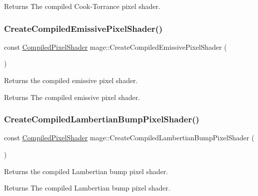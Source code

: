 \begin{DoxyReturn}{Returns}
The compiled Cook-\/\+Torrance pixel shader. 
\end{DoxyReturn}
\hypertarget{namespacemage_aca957ccbcc6750522ac8c77402c70c2d}{}\label{namespacemage_aca957ccbcc6750522ac8c77402c70c2d} 
\subsubsection{\texorpdfstring{Create\+Compiled\+Emissive\+Pixel\+Shader()}{CreateCompiledEmissivePixelShader()}}
{\footnotesize\ttfamily const \hyperlink{structmage_1_1_compiled_pixel_shader}{Compiled\+Pixel\+Shader} mage\+::\+Create\+Compiled\+Emissive\+Pixel\+Shader (\begin{DoxyParamCaption}{ }\end{DoxyParamCaption})}

Returns the compiled emissive pixel shader.

\begin{DoxyReturn}{Returns}
The compiled emissive pixel shader. 
\end{DoxyReturn}
\hypertarget{namespacemage_adae03173c6d59828bce99157beb7be99}{}\label{namespacemage_adae03173c6d59828bce99157beb7be99} 
\subsubsection{\texorpdfstring{Create\+Compiled\+Lambertian\+Bump\+Pixel\+Shader()}{CreateCompiledLambertianBumpPixelShader()}}
{\footnotesize\ttfamily const \hyperlink{structmage_1_1_compiled_pixel_shader}{Compiled\+Pixel\+Shader} mage\+::\+Create\+Compiled\+Lambertian\+Bump\+Pixel\+Shader (\begin{DoxyParamCaption}{ }\end{DoxyParamCaption})}

Returns the compiled Lambertian bump pixel shader.

\begin{DoxyReturn}{Returns}
The compiled Lambertian bump pixel shader. 
\end{DoxyReturn}
\hypertarget{namespacemage_aed1a73bf0197b60071335329b0a3f171}{}\label{namespacemage_aed1a73bf0197b60071335329b0a3f171} 
